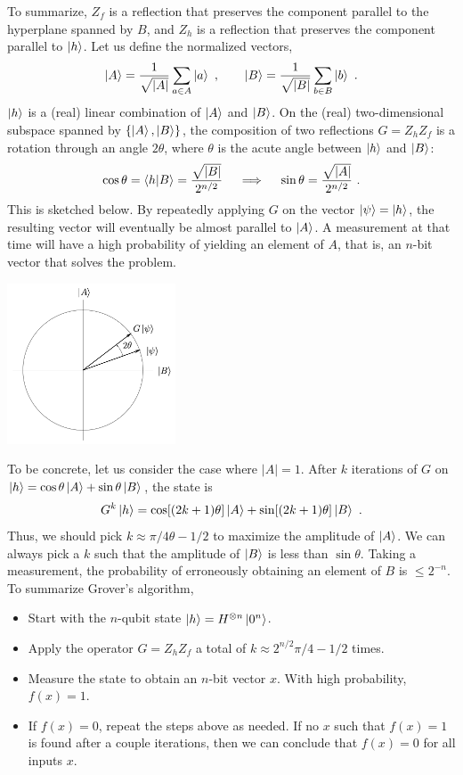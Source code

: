 \documentclass{article}
\numberwithin{equation}{section} 		%
\begin{document}
To summarize, $Z_f$ is a reflection that preserves the component parallel to the hyperplane spanned by $B$, and $Z_h$ is a reflection that preserves the component parallel to $\ket{h}$.
Let us define the normalized vectors,
\begin{align}
	\ket{A} = \frac{1}{\sqrt{|A|}} \sum_{a \in A} \ket{a} ~, \qquad
	\ket{B} = \frac{1}{\sqrt{|B|}} \sum_{b \in B} \ket{b} ~.
\end{align}
$\ket{h}$ is a (real) linear combination of $\ket{A}$ and $\ket{B}$.
On the (real) two-dimensional subspace spanned by $\{\ket{A}, \ket{B}\}$, the composition of two reflections $G = Z_h Z_f$ is a rotation through an angle $2\theta$, where $\theta$ is the acute angle between $\ket{h}$ and $\ket{B}$:
\begin{align}
	 \cos\theta = \braket{h}{B} = \frac{\sqrt{|B|}}{2^{n/2}} \quad\implies\quad \sin \theta = \frac{\sqrt{|A|}}{2^{n/2}} ~.
\end{align}
This is sketched below.
By repeatedly applying $G$ on the vector $\ket{\psi} = \ket{h}$, the resulting vector will eventually be almost parallel to $\ket{A}$.
A measurement at that time will have a high probability of yielding an element of $A$, that is, an $n$-bit vector that solves the problem.

\centerline{
\includegraphics[width=5cm]{grover.png}
}

To be concrete, let us consider the case where $|A| = 1$.
After $k$ iterations of $G$ on $\ket{h} = \cos\theta \ket{A} + \sin\theta \ket{B}$, the state is
\begin{align}
	G^k \ket{h} = \cos[(2k+1)\theta] \ket{A} + \sin[(2k + 1)\theta] \ket{B} ~.
\end{align}
Thus, we should pick $k \approx  \pi / 4\theta - 1/2$ to maximize the amplitude of $\ket{A}$.
We can always pick a $k$ such that the amplitude of $\ket{B}$ is less than $\sin \theta$.
Taking a measurement, the probability of erroneously obtaining an element of $B$ is $ \leq 2^{-n}$.
To summarize Grover's algorithm,
\begin{itemize}
	\item Start with the $n$-qubit state $\ket{h} = H^{\otimes n} \ket{0^n}$.
	\item Apply the operator $G = Z_h Z_f$ a total of $k \approx 2^{n/2} \pi/4 - 1/2$ times.
	\item Measure the state to obtain an $n$-bit vector $x$. With high probability, $f(x) = 1$.
	\item If $f(x)=0$, repeat the steps above as needed. If no $x$ such that $f(x) = 1$ is found after a couple iterations, then we can conclude that $f(x) = 0$ for all inputs $x$.
\end{itemize}
\end{document}
